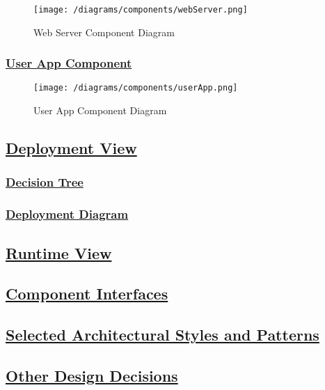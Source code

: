			\begin{figure}[ht]
				\centering
				\texttt{[image: /diagrams/components/webServer.png]}
				\caption{\label{fig:webServerComp} Web Server Component Diagram}
			\end{figure}
		
		\subsubsection[User App Component]{\hyperlink{toc}{User App Component}}
			\label{sec:userAppComponent}
			
			\begin{figure}[ht]
				\centering
				\texttt{[image: /diagrams/components/userApp.png]}
				\caption{\label{fig:userAppComp} User App Component Diagram}
			\end{figure}
		
	\subsection[Deployment View]{\hyperlink{toc}{Deployment View}}
		\label{sec:deploymentView}
		
		\subsubsection[Decision Tree]{\hyperlink{toc}{Decision Tree}}
			\label{sec:decisionTree}
			
		\subsubsection[Deployment Diagram]{\hyperlink{toc}{Deployment Diagram}}
			\label{sec:deploymentDiagram}
			
	\subsection[Runtime View]{\hyperlink{toc}{Runtime View}}
		\label{sec:runtimeView}
		
	\subsection[Component Interfaces]{\hyperlink{toc}{Component Interfaces}}
		\label{sec:componentInterfaces}
		
	\subsection[Selected Architectural Styles and Patterns]{\hyperlink{toc}{Selected Architectural Styles and Patterns}}
		\label{sec:selectedArchitecturalStylesAndPatterns}
		
	\subsection[Other Design Decisions]{\hyperlink{toc}{Other Design Decisions}}
		\label{sec:otherDesignDecisions}						